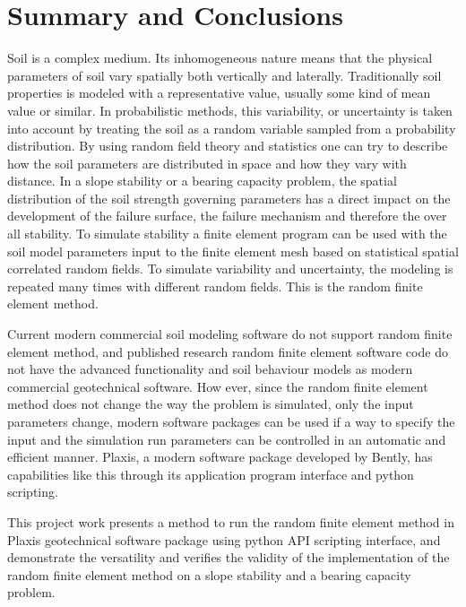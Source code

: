 \section*{Summary and Conclusions}
Soil is a complex medium. 
Its inhomogeneous nature means that the physical parameters of soil vary spatially both vertically and laterally. 
Traditionally soil properties is modeled with a representative value, usually some kind of mean value or similar. 
In probabilistic methods, this variability, or uncertainty is taken into account by treating the soil as a random variable sampled from a probability distribution. 
By using random field theory and statistics one can try to describe how the soil parameters are distributed in space and how they vary with distance.
In a slope stability or a bearing capacity problem, the spatial distribution of the soil strength governing parameters has a direct impact on the development of the failure surface, the failure mechanism and therefore the over all stability.
To simulate stability a finite element program can be used with the soil model parameters input to the finite element mesh based on statistical spatial correlated random fields.
To simulate variability and uncertainty, the modeling is repeated many times with different random fields.
This is the random finite element method.


Current modern commercial soil modeling software do not support random finite element method, and published research random finite element software code do not have the advanced functionality and soil behaviour models as modern commercial geotechnical software. 
How ever, since the random finite element method does not change the way the problem is simulated, only the input parameters change, modern software packages can be used if a way to specify the input and the simulation run parameters can be controlled in an automatic and efficient manner.
Plaxis, a modern software package developed by Bently, has capabilities like this through its application program interface and python scripting. 

This project work presents a method to run the random finite element method in Plaxis geotechnical software package using python API scripting interface, and demonstrate the versatility and verifies the validity of the implementation of the random finite element method on a slope stability and a bearing capacity problem.
